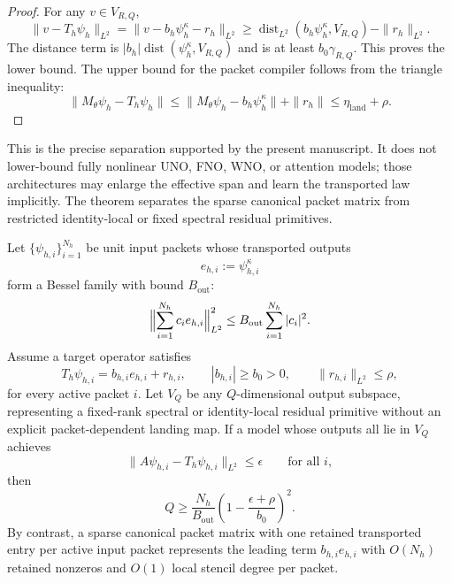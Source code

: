 \begin{proof}
For any $v\in V_{R,Q}$,
\[
\|v-T_h\psi_h\|_{L^2}
=\|v-b_h\psi_h^\kappa-r_h\|_{L^2}
\ge \operatorname{dist}_{L^2}(b_h\psi_h^\kappa,V_{R,Q})-\|r_h\|_{L^2}.
\]
The distance term is $|b_h|\operatorname{dist}(\psi_h^\kappa,V_{R,Q})$ and is
at least $b_0\gamma_{R,Q}$.  This proves the lower bound.  The upper bound for
the packet compiler follows from the triangle inequality:
\[
\|M_\theta\psi_h-T_h\psi_h\|
\le \|M_\theta\psi_h-b_h\psi_h^\kappa\|+\|r_h\|
\le \eta_{\mathrm{land}}+\rho .
\]
\end{proof}

This is the precise separation supported by the present manuscript.  It does
not lower-bound fully nonlinear UNO, FNO, WNO, or attention models; those
architectures may enlarge the effective span and learn the transported law
implicitly.  The theorem separates the sparse canonical packet matrix from
restricted identity-local or fixed spectral residual primitives.

\begin{theorem}
\label{thm:many-packet-rank-separation}
Let $\{\psi_{h,i}\}_{i=1}^{N_h}$ be unit input packets whose transported
outputs
\[
e_{h,i}:=\psi_{h,i}^{\kappa}
\]
form a Bessel family with bound $B_{\mathrm{out}}$:
\[
\Bigl\|\sum_{i=1}^{N_h} c_i e_{h,i}\Bigr\|_{L^2}^2
\le B_{\mathrm{out}}\sum_{i=1}^{N_h}|c_i|^2 .
\]
Assume a target operator satisfies
\[
T_h\psi_{h,i}=b_{h,i}e_{h,i}+r_{h,i},\qquad
|b_{h,i}|\ge b_0>0,\qquad
\|r_{h,i}\|_{L^2}\le \rho ,
\]
for every active packet $i$.  Let $V_Q$ be any $Q$-dimensional output
subspace, representing a fixed-rank spectral or identity-local residual
primitive without an explicit packet-dependent landing map.  If a model whose
outputs all lie in $V_Q$ achieves
\[
\|A\psi_{h,i}-T_h\psi_{h,i}\|_{L^2}\le \epsilon
\qquad\text{for all }i,
\]
then
\[
Q\ge
\frac{N_h}{B_{\mathrm{out}}}
\left(1-\frac{\epsilon+\rho}{b_0}\right)^2 .
\]
By contrast, a sparse canonical packet matrix with one retained transported
entry per active input packet represents the leading term
$b_{h,i}e_{h,i}$ with $O(N_h)$ retained nonzeros and $O(1)$ local stencil
degree per packet.
\end{theorem}

